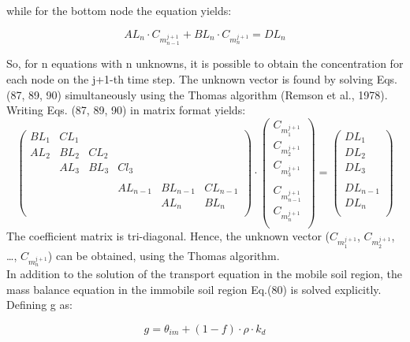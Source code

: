 while for the bottom node the equation yields:

\begin{equation}
AL_n \cdot C_m_{n-1}^{j+1} +BL_n \cdot C_m_{n}^{j+1} = DL_n
\end{equation}

So, for n equations with n unknowns, it is possible to obtain the concentration for each node on the j+1-th time step. The unknown vector is found by solving Eqs. (87, 89, 90) simultaneously using the Thomas algorithm (Remson et al., 1978). Writing Eqs. (87, 89, 90) in matrix format yields:
\begin{equation}
\begin{pmatrix}
BL_1 & CL_1 & & & & \\
AL_2 &BL_2 &CL_2& & & \\
 & AL_3 &BL_3 & Cl_3 & & \\
 & & & & & \\
 & & &AL_{n-1}& BL_{n-1} & CL_{n-1}\\
 & & & & AL_n & BL_n\\
\end{pmatrix}
\cdot
\begin{pmatrix}
C_m_1^{j+1} \\ C_m_2^{j+1} \\ C_m_3^{j+1} \\ \\ C_m_{n-1}^{j+1} \\C_m_n^{j+1} \\
\end{pmatrix}
= 
\begin{pmatrix}
DL_1 \\ DL_2 \\ DL_3 \\ \\ DL_{n-1} \\DL_n\\
\end{pmatrix}

\end{equation}
The coefficient matrix is tri-diagonal. Hence, the unknown vector ($C_m_1^{j+1}$, $C_m_2^{j+1}$, \ldots , $C_m_n^{j+1}$) can be obtained, using the Thomas algorithm.\\

In addition to the solution of the transport equation in the mobile soil region, the mass balance equation in the immobile soil region Eq.(80) is solved explicitly. Defining g as:

\begin{equation}
g = \theta_{im} + (1-f) \cdot \rho \cdot k_d
\end{equation}

